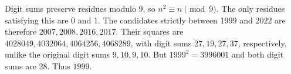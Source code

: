 Digit sums preserve residues modulo 9, so $n^2\equiv n\pmod9$. The only residues satisfying this are 0 and 1. The candidates strictly between 1999 and 2022 are therefore $2007,2008,2016,2017$. Their squares are $4028049,4032064,4064256,4068289$, with digit sums $27,19,27,37$, respectively, unlike the original digit sums $9,10,9,10$. But $1999^2=3996001$ and both digit sums are 28. Thus $\boxed{1999}$.
